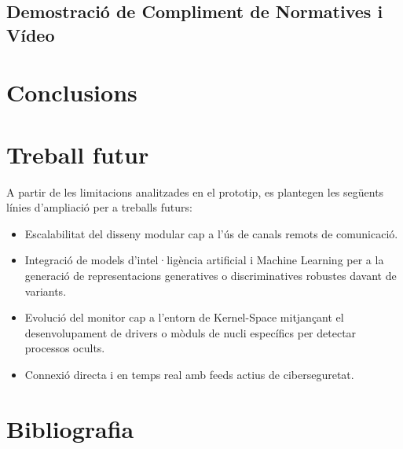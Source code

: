 \documentclass[12pt,a4paper]{report}
\begin{document}
\section{Demostració de Compliment de Normatives i Vídeo}


\chapter{Conclusions}
\label{ch:conclusions}


\chapter{Treball futur}
\label{ch:treballfutur}
A partir de les limitacions analitzades en el prototip, es plantegen les següents línies d'ampliació per a treballs futurs:
\begin{itemize}
    \item Escalabilitat del disseny modular cap a l'ús de canals remots de comunicació.
    \item Integració de models d'intel·ligència artificial i Machine Learning per a la generació de representacions generatives o discriminatives robustes davant de variants.
    \item Evolució del monitor cap a l'entorn de Kernel-Space mitjançant el desenvolupament de drivers o mòduls de nucli específics per detectar processos ocults.
    \item Connexió directa i en temps real amb feeds actius de ciberseguretat.
\end{itemize}


\chapter{Bibliografia}
\label{ch:bibliografia}
\end{document}
